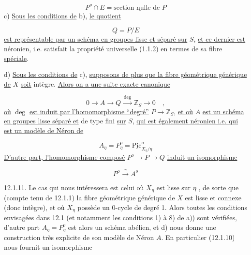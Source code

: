 \begin{equation}\tag{12.1.6}
P^o \cap E = \underline{\mbox{section nulle de } P}
\end{equation}
c) \underline{Sous les conditions de} b), \underline{le quotient}

\begin{equation}\tag{12.1.7}
Q = P/E
\end{equation}
\underline{est représentable par un schéma en groupes lisse et séparé sur} $S$, \underline{et ce dernier est} néronien, \underline{i.e. satisfait la propriété universelle} (1.1.2) \underline{en termes de sa fibre spéciale}.

d) \underline{Sous les conditions de} c), \underline{supposons de plus que la fibre géométrique générique de} $X$ \underline{soit} intègre. \underline{Alors on a une suite exacte canonique}

\begin{equation}\tag{12.1.8}
0 \longrightarrow A \longrightarrow Q \xrightarrow{\ \deg\ } \mathbb{Z}_S \longrightarrow 0 \quad ,
\end{equation}
\underline{où} $\deg$ \underline{est induit par l'homomorphisme ``degré''} $P \longrightarrow \mathbb{Z}_S$, \underline{et où} $A$ \underline{est un schéma en groupes lisse séparé et} de type fini \underline{sur} $S$, \underline{qui est également néronien i.e. qui est un modèle de Néron de}

\begin{equation}\tag{12.1.9}
A_\eta = P_\eta^o = \underline{\mathrm{Pic}}^o_{X_\eta/\eta}
\end{equation}
\underline{D'autre part, l'homomorphisme composé} $P^o \longrightarrow P \to Q$ \underline{induit un isomorphisme}

\begin{equation}\tag{12.1.10}
P^o \xrightarrow{\ \sim\ } A^o
\end{equation}


12.1.11. Le cas qui nous intéressera est celui où $X_\eta$ est lisse sur $\eta$ , de sorte que (compte tenu de 12.1.1) la fibre géométrique générique de $X$ est lisse et connexe (donc intègre), et où $X_\eta$ possède un $0$-cycle de degré 1. Alors toutes les conditions envisagées dans 12.1 (et notamment les conditions 1) à 8) de a)) sont vérifiées, d'autre part $A_\eta = P_\eta^o$ est alors un schéma abélien, et d) nous donne une construction très explicite de son modèle de Néron $A$. En particulier (12.1.10) nous fournit un isomorphisme

